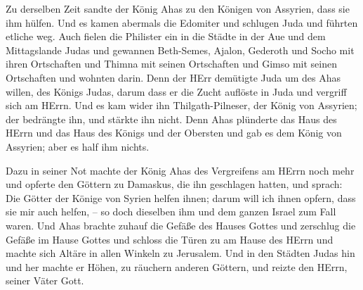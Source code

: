  Zu derselben Zeit sandte der König Ahas zu den Königen von
Assyrien, dass sie ihm hülfen.  Und es kamen abermals die
Edomiter und schlugen Juda und führten etliche weg.  Auch
fielen die Philister ein in die Städte in der Aue und dem Mittagslande
Judas und gewannen Beth-Semes, Ajalon, Gederoth und Socho mit ihren
Ortschaften und Thimna mit seinen Ortschaften und Gimso mit seinen
Ortschaften und wohnten darin.  Denn der HErr demütigte
Juda um des Ahas willen, des Königs Judas, darum dass er die Zucht
auflöste in Juda und vergriff sich am HErrn.  Und es kam
wider ihn Thilgath-Pilneser, der König von Assyrien; der bedrängte ihn,
und stärkte ihn nicht.  Denn Ahas plünderte das Haus des
HErrn und das Haus des Königs und der Obersten und gab es dem König von
Assyrien; aber es half ihm nichts.

 Dazu in seiner Not machte der König Ahas des Vergreifens
am HErrn noch mehr  und opferte den Göttern zu Damaskus,
die ihn geschlagen hatten, und sprach: Die Götter der Könige von Syrien
helfen ihnen; darum will ich ihnen opfern, dass sie mir auch helfen, --
so doch dieselben ihm und dem ganzen Israel zum Fall waren.
 Und Ahas brachte zuhauf die Gefäße des Hauses Gottes und
zerschlug die Gefäße im Hause Gottes und schloss die Türen zu am Hause
des HErrn und machte sich Altäre in allen Winkeln zu Jerusalem.
 Und in den Städten Judas hin und her machte er Höhen, zu
räuchern anderen Göttern, und reizte den HErrn, seiner Väter Gott.

